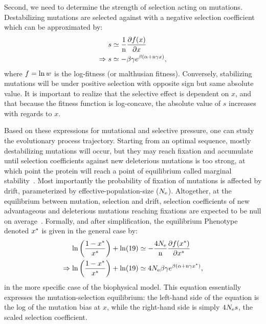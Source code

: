 Second, we need to determine the strength of selection acting on mutations.
Destabilizing mutations are selected against with a negative selection coefficient which can be approximated by:
\begin{align}
    s & \simeq \frac{1}{\Nsite}\frac{ \partial \logfit (x) }{\partial x} \label{eq:s} \\
    \Rightarrow s & \simeq - \beta \gamma e^{\beta (\DeltaGmin + \Nsite \gamma x)}, \label{eq:s-unfolded}
\end{align}
where $ f = \ln w$ is the log-fitness (or malthusian fitness).
Conversely, stabilizing mutations will be under positive selection with opposite sign but same absolute value.
It is important to realize that the selective effect is dependent on $x$, and that because the fitness function is log-concave, the absolute value of $s$ increases with regards to $x$.

Based on these expressions for mutational and selective pressure, one can study the evolutionary process trajectory.
Starting from an optimal sequence, mostly destabilizing mutations will occur, but they may reach fixation and accumulate until selection coefficients against new deleterious mutations is too strong, at which point the protein will reach a point of equilibrium called marginal stability~\citep{Taverna2002, Bloom2007}.
Most importantly the probability of fixation of mutations is affected by \gls{drift}, parameterized by \gls{effective-population-size} ($N_{\mathrm{e}}$).
Altogether, at the equilibrium between mutation, selection and drift, selection coefficients of new advantageous and deleterious mutations reaching fixations are expected to be null on average~\citep{Goldstein2013}.
Formally, and after simplification, the equilibrium \gls{Phenotype} denoted $x^{*}$ is given in the general case by:
\begin{align}
    \ln \left( \frac{1 - x\eq}{x\eq} \right) + \ln (19) & \simeq - \frac{4\Ne}{\Nsite} \frac{ \partial \logfit (x\eq) }{\partial {x\eq}} \\
    \Rightarrow \ln \left( \frac{1 - x\eq}{x\eq} \right) + \ln (19) & \simeq 4\Ne \beta \gamma e^{\beta (\DeltaGmin + \Nsite \gamma x\eq)} \text{,} \label{eq:equilibrium}
\end{align}
in the more specific case of the biophysical model.
This equation essentially expresses the mutation-selection equilibrium: the left-hand side of the equation is the log of the mutation bias at $x$, while the right-hand side is simply $4 N_{\mathrm{e}} s$, the scaled selection coefficient.

